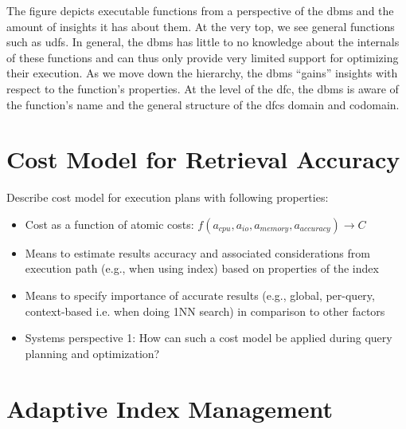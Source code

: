 The figure depicts executable functions from a perspective of the \acrshort{dbms} and the amount of insights it has about them. At the very top, we see general functions such as \acrshort{udf}s. In general, the \acrshort{dbms} has little to no knowledge about the internals of these functions and can thus only provide very limited support for optimizing their execution. As we move down the hierarchy, the \acrshort{dbms} ``gains'' insights with respect to the function's properties. At the level of the \acrshort{dfc}, the \acrshort{dbms} is aware of the function's name and the general structure of the \acrshort{dfc}s domain and codomain. 





\section{Cost Model for Retrieval Accuracy}
Describe cost model for execution plans with following properties:

\begin{itemize}
    \item Cost as a function of atomic costs: $f(a_{cpu}, a_{io}, a_{memory}, a_{accuracy}) \longrightarrow C$
    \item Means to estimate results accuracy and associated considerations from execution path (e.g., when using index) based on properties of the index
    \item Means to specify importance of accurate results (e.g., global, per-query, context-based i.e. when doing 1NN search) in comparison to other factors
    \item Systems perspective 1: How can such a cost model be applied during query planning and optimization?
\end{itemize}

\section{Adaptive Index Management}

